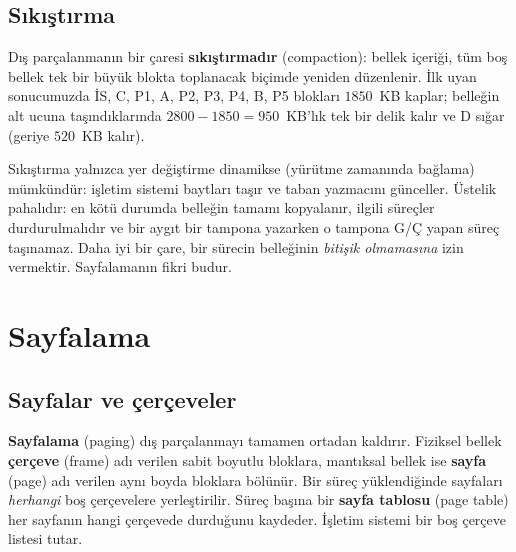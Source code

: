 \documentclass[11pt,a4paper]{article}
\newcommand{\term}[1]{\textbf{\color{mintdeep}#1}}
\begin{document}
\subsection{Sıkıştırma}

Dış parçalanmanın bir çaresi \term{sıkıştırmadır} (compaction): bellek içeriği, tüm boş bellek tek bir büyük blokta toplanacak biçimde yeniden düzenlenir. İlk uyan sonucumuzda İS, C, P1, A, P2, P3, P4, B, P5 blokları $1850$~KB kaplar; belleğin alt ucuna taşındıklarında $2800 - 1850 = 950$~KB'lık tek bir delik kalır ve D sığar (geriye $520$~KB kalır).

Sıkıştırma yalnızca yer değiştirme dinamikse (yürütme zamanında bağlama) mümkündür: işletim sistemi baytları taşır ve taban yazmacını günceller. Üstelik pahalıdır: en kötü durumda belleğin tamamı kopyalanır, ilgili süreçler durdurulmalıdır ve bir aygıt bir tampona yazarken o tampona G/Ç yapan süreç taşınamaz. Daha iyi bir çare, bir sürecin belleğinin \emph{bitişik olmamasına} izin vermektir. Sayfalamanın fikri budur.

\section{Sayfalama}
\label{sec:paging}

\subsection{Sayfalar ve çerçeveler}

\term{Sayfalama} (paging) dış parçalanmayı tamamen ortadan kaldırır. Fiziksel bellek \term{çerçeve} (frame) adı verilen sabit boyutlu bloklara, mantıksal bellek ise \term{sayfa} (page) adı verilen aynı boyda bloklara bölünür. Bir süreç yüklendiğinde sayfaları \emph{herhangi} boş çerçevelere yerleştirilir. Süreç başına bir \term{sayfa tablosu} (page table) her sayfanın hangi çerçevede durduğunu kaydeder. İşletim sistemi bir boş çerçeve listesi tutar.
\end{document}
